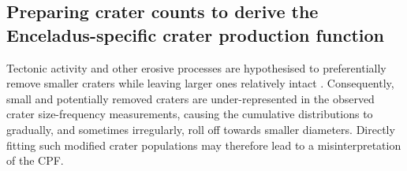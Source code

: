 \documentclass[preprint,11pt,3p,times,authoryear]{elsarticle}
\begin{document}
\subsection{Preparing crater counts to derive the Enceladus-specific crater production function}
\label{subsec:cpf}
Tectonic activity and other erosive processes are hypothesised to preferentially remove smaller craters while leaving larger ones relatively intact \citep{Michael2010}. Consequently, small and potentially removed craters are under-represented in the observed crater size-frequency measurements, causing the cumulative distributions to gradually, and sometimes irregularly, roll off towards smaller diameters. Directly fitting such modified crater populations may therefore lead to a misinterpretation of the CPF.\\

\end{document}

